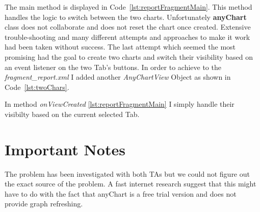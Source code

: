     
    
    The main method is displayed in Code~\ref{lst:reportFragmentMain}.
        This method handles the
        logic to switch between the two charts.
        Unfortunately \textbf{anyChart} class does not collaborate and does not reset the chart
        once created.
        Extensive trouble-shooting and many different attempts and approaches to make it work had
        been taken without success.
        The last attempt which seemed the most promising had the goal to create two charts and
        switch their visibility based on an event listener on the two Tab's buttons.
        In order to achieve to the \textit{fragment\_report.xml} I added another
        \textit{AnyChartView} Object as shown in Code~\ref{lst:twoChars}.
        
    
    
    In method \textit{onViewCreated} \ref{lst:reportFragmentMain} I simply handle their
        visibilty based on the current
        selected Tab.

        
        
\section{Important Notes}

The problem has been investigated with both TAs but we could not figure out the exact source of
the problem.
A fast internet research suggest that this might have to do with the fact that anyChart
is a free trial version and does not provide graph refreshing.

